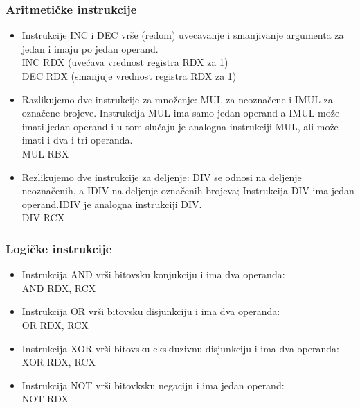 \documentclass[hyperref={pdfpagelabels=false}]{beamer}
\begin{document}
	\begin{frame}
		\frametitle{Aritmeti\v cke instrukcije}
		\begin{itemize}
			\item \pause Instrukcije INC i DEC vr\v se (redom) uvecavanje i smanjivanje argumenta za jedan i imaju po jedan operand. \pause \\
							INC RDX (uve\' cava vrednost registra RDX za 1) \pause \\
							DEC RDX (smanjuje vrednost registra RDX za 1) \pause
			\item Razlikujemo dve instrukcije za mno\v zenje: MUL za neozna\v cene i IMUL za ozna\v cene brojeve. Instrukcija MUL ima samo jedan operand a 
					IMUL mo\v ze imati jedan operand i u tom slu\v caju je analogna instrukciji MUL, ali mo\v ze imati i dva i tri operanda.\pause \\
					MUL RBX \pause 
			\item Rezlikujemo dve instrukcije za deljenje: DIV se odnosi na deljenje neozna\v cenih, a IDIV na deljenje ozna\v cenih brojeva; Instrukcija
					DIV ima jedan operand.IDIV je analogna instrukciji DIV.\pause \\
					DIV RCX 
		\end{itemize}
	\end{frame}
	
	\begin{frame}[fragile]
		\frametitle{Logi\v cke instrukcije}
		\begin{itemize}
			\item \pause Instrukcija AND vr\v si bitovsku konjukciju i ima dva operanda:\pause
			 \\ AND RDX, RCX\pause
			\item Instrukcija OR vr\v si bitovsku disjunkciju i ima dva operanda: \pause
			 \\ OR RDX, RCX \pause
			\item Instrukcija XOR vr\v si bitovsku ekskluzivnu disjunkciju i ima dva operanda:\pause
			 \\ XOR RDX, RCX \pause
			\item Instrukcija NOT vr\v si bitovksku negaciju i ima jedan operand: \pause
			 \\ NOT RDX
		\end{itemize}
	\end{frame}
	
\end{document}
